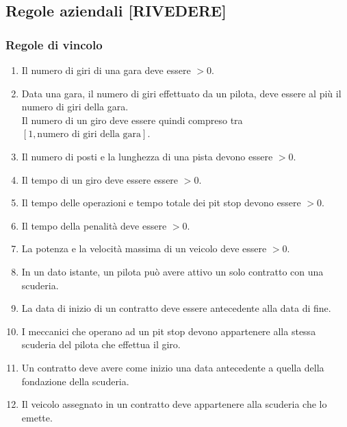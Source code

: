 \documentclass[11pt]{article}
\begin{document}
\subsection{Regole aziendali [RIVEDERE]}
\subsubsection{Regole di vincolo}
\begin{enumerate}[label={RV \arabic*}, leftmargin=4em]
    \item Il numero di giri di una gara deve essere $>0$.
    \item Data una gara, il numero di giri effettuato da un pilota, deve essere al più il numero di giri della gara.\\
          Il numero di un giro deve essere quindi compreso tra $[1, \text{numero di giri della gara}]$.
    \item Il numero di posti e la lunghezza di una pista devono essere $>0$. 
    \item Il tempo di un giro deve essere essere $>0$. 
    \item Il tempo delle operazioni e tempo totale dei pit stop devono essere $>0$.
    \item Il tempo della penalità deve essere $>0$.
    \item La potenza e la velocità massima di un veicolo deve essere $>0$.
    \item In un dato istante, un pilota può avere attivo un solo contratto con una scuderia.
    \item La data di inizio di un contratto deve essere antecedente alla data di fine.
    \item I meccanici che operano ad un pit stop devono appartenere alla stessa scuderia del pilota che effettua il giro.
    \item Un contratto deve avere come inizio una data antecedente a quella della fondazione della scuderia.
    \item Il veicolo assegnato in un contratto deve appartenere alla scuderia che lo emette.
\end{enumerate}

\end{document}
